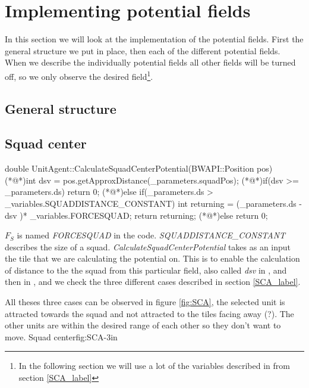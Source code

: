 {\color[rgb]{0.000000,0.000000,0.000000}\section{Implementing potential fields}
	In this section we will look at the implementation of the potential fields.
	First the general structure we put in place, then each of the different potential fields. When we describe the individually potential fields all other fields will be turned off, so we only observe the desired field\footnote{In the following section we will use a lot of the variables described in from section \ref{SCA_label}}.
	
	\subsection{General structure}
	
	
	
	\subsection{Squad center}	
		\begin{Sourcecode}[caption=Squad center]
double UnitAgent::CalculateSquadCenterPotential(BWAPI::Position pos)
{
	(*@\lnote@*)int dsv = pos.getApproxDistance(_parameters.squadPos);
	(*@\lnote@*)if(dsv >= _parameters.ds)
		return 0;	
	(*@\lnote@*)else if(_parameters.ds > _variables.SQUADDISTANCE_CONSTANT)
	{
		int returning = (_parameters.ds - dsv )* _variables.FORCESQUAD;
		return returning;
	}
	(*@\lnote@*)else
		return 0;
}
\end{Sourcecode}
		$F_{S}$ is named \textit{FORCESQUAD} in the code.
		\textit{SQUADDISTANCE\_CONSTANT} describes the size of a squad. 
		\textit{CalculateSquadCenterPotential} takes as an input the tile that we are calculating the potential on. This is to enable the calculation of distance to the the squad from this particular field, also called \textit{dsv} in , and then in , and  we check the three different cases described in section \ref{SCA_label}.		
		
		All theses three cases can be observed in figure \ref{fig:SCA}, the selected unit is attracted towards the squad and not attracted to the tiles facing away (?). The other units are within the desired range of each other so they don't want to move.
			{Squad center}{fig:SCA}{-3in}
				 
}

